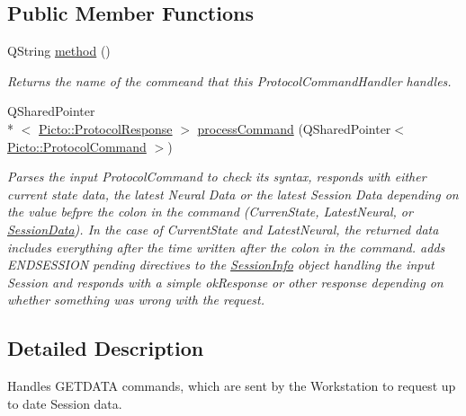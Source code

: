 \subsection*{Public Member Functions}
\begin{DoxyCompactItemize}
\item 
\hypertarget{struct_get_data_command_handler_aa230c5958bea5c6019483fc0070f08c2}{Q\-String \hyperlink{struct_get_data_command_handler_aa230c5958bea5c6019483fc0070f08c2}{method} ()}\label{struct_get_data_command_handler_aa230c5958bea5c6019483fc0070f08c2}

\begin{DoxyCompactList}\small\item\em Returns the name of the commeand that this Protocol\-Command\-Handler handles. \end{DoxyCompactList}\item 
\hypertarget{struct_get_data_command_handler_aa1833f79ddac0a57b416475e6cdad67f}{Q\-Shared\-Pointer\\*
$<$ \hyperlink{struct_picto_1_1_protocol_response}{Picto\-::\-Protocol\-Response} $>$ \hyperlink{struct_get_data_command_handler_aa1833f79ddac0a57b416475e6cdad67f}{process\-Command} (Q\-Shared\-Pointer$<$ \hyperlink{struct_picto_1_1_protocol_command}{Picto\-::\-Protocol\-Command} $>$)}\label{struct_get_data_command_handler_aa1833f79ddac0a57b416475e6cdad67f}

\begin{DoxyCompactList}\small\item\em Parses the input Protocol\-Command to check its syntax, responds with either current state data, the latest Neural Data or the latest Session Data depending on the value befpre the colon in the command (Curren\-State, Latest\-Neural, or \hyperlink{class_session_data}{Session\-Data}). In the case of Current\-State and Latest\-Neural, the returned data includes everything after the time written after the colon in the command. adds E\-N\-D\-S\-E\-S\-S\-I\-O\-N pending directives to the \hyperlink{class_session_info}{Session\-Info} object handling the input Session and responds with a simple ok\-Response or other response depending on whether something was wrong with the request. \end{DoxyCompactList}\end{DoxyCompactItemize}


\subsection{Detailed Description}
Handles G\-E\-T\-D\-A\-T\-A commands, which are sent by the Workstation to request up to date Session data. 

